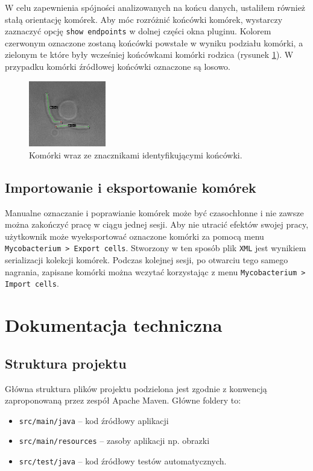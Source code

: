 \documentclass[declaration,shortabstract,mgr]{iithesis}
\begin{document}
W celu zapewnienia spójności analizowanych na końcu danych, ustaliłem również stałą orientację komórek.
Aby móc rozróżnić końcówki komórek, wystarczy zaznaczyć opcję \texttt{show endpoints} w dolnej części okna pluginu.
Kolorem czerwonym oznaczone zostaną końcówki powstałe w wyniku podziału komórki, a zielonym te które były wcześniej końcówkami komórki rodzica (rysunek \ref{fig:ui-show-endpoints}). W przypadku komórki źródłowej końcówki oznaczone są losowo.

\begin{figure}
  \centering
  \includegraphics[width=0.3\textwidth]{images/ui-show-endpoints.png}
  \caption{Komórki wraz ze znacznikami identyfikującymi końcówki.}
  \label{fig:ui-show-endpoints}
\end{figure}

\subsection{Importowanie i eksportowanie komórek}

Manualne oznaczanie i poprawianie komórek może być czasochłonne i nie zawsze można zakończyć pracę w ciągu jednej sesji.
Aby nie utracić efektów swojej pracy, użytkownik może wyeksportować oznaczone komórki za pomocą menu \texttt{Mycobacterium > Export cells}.
Stworzony w ten sposób plik \texttt{XML} jest wynikiem serializacji kolekcji komórek.
Podczas kolejnej sesji, po otwarciu tego samego nagrania, zapisane komórki można wczytać korzystając z menu \texttt{Mycobacterium > Import cells}.

\section{Dokumentacja techniczna}

\subsection{Struktura projektu}

Główna struktura plików projektu podzielona jest zgodnie z konwencją zaproponowaną przez zespół Apache Maven\cite{docs:maven-project-layout}. Główne foldery to:
\begin{itemize}
  \item \texttt{src/main/java} -- kod źródłowy aplikacji
  \item \texttt{src/main/resources} -- zasoby aplikacji np. obrazki
  \item \texttt{src/test/java} -- kod źródłowy testów automatycznych.
\end{itemize}
\end{document}

